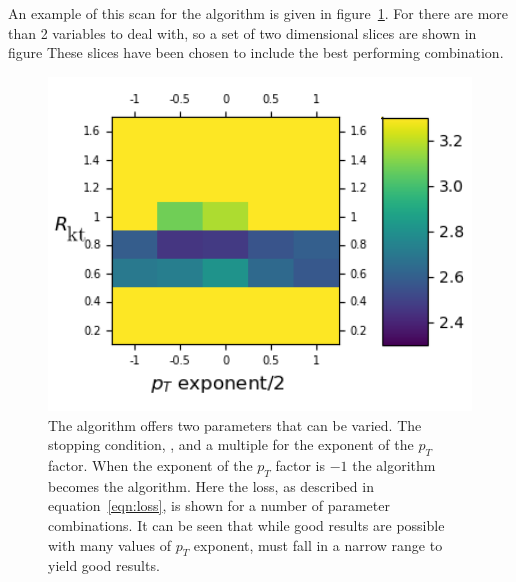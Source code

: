 An example of this scan for the \genkt{} algorithm is given in figure~\ref{fig:scan_genkt}.
For \spectral{} there are more than 2 variables to deal with, 
so a set of two dimensional slices are shown in figure
These slices have been chosen to include the best performing combination.
    \begin{figure}[htp]
        \begin{minipage}[c]{0.5\textwidth}
            \includegraphics[width=1\textwidth]{graphics/trangle_scan_genkt.png}
        \end{minipage}\hfill
        \begin{minipage}[c]{0.45\textwidth}
            \caption{The \genkt{} algorithm offers two parameters that can be varied.
                The stopping condition, \ktstoppingdeltar{}, and a multiple for the exponent of the \(p_T\) factor.
                When the exponent of the \(p_T\) factor is \(-1\) the algorithm becomes the \antikt{} algorithm.
                Here the loss, as described in equation~\ref{eqn:loss}, is shown for a number of parameter combinations.
                It can be seen that while good results are possible with many values of \(p_T\) exponent,
                \ktstoppingdeltar{} must fall in a narrow range to yield good results.
             }\label{fig:scan_genkt}
        \end{minipage}
    \end{figure}    

